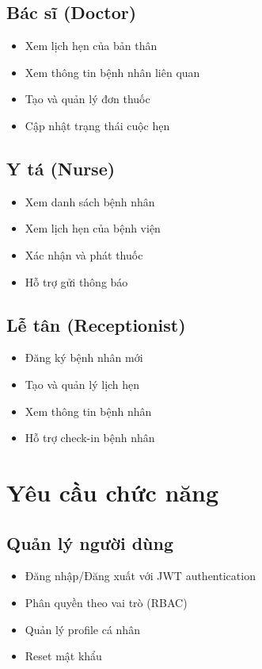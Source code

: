 \documentclass[12pt,a4paper]{report}
\begin{document}
    \subsection{Bác sĩ (Doctor)}
    \begin{itemize}
        \item Xem lịch hẹn của bản thân
        \item Xem thông tin bệnh nhân liên quan
        \item Tạo và quản lý đơn thuốc
        \item Cập nhật trạng thái cuộc hẹn
    \end{itemize}

    \subsection{Y tá (Nurse)}
    \begin{itemize}
        \item Xem danh sách bệnh nhân
        \item Xem lịch hẹn của bệnh viện
        \item Xác nhận và phát thuốc
        \item Hỗ trợ gửi thông báo
    \end{itemize}

    \subsection{Lễ tân (Receptionist)}
    \begin{itemize}
        \item Đăng ký bệnh nhân mới
        \item Tạo và quản lý lịch hẹn
        \item Xem thông tin bệnh nhân
        \item Hỗ trợ check-in bệnh nhân
    \end{itemize}

    \section{Yêu cầu chức năng}

    \subsection{Quản lý người dùng}
    \begin{itemize}
        \item Đăng nhập/Đăng xuất với JWT authentication
        \item Phân quyền theo vai trò (RBAC)
        \item Quản lý profile cá nhân
        \item Reset mật khẩu
    \end{itemize}
\end{document}
